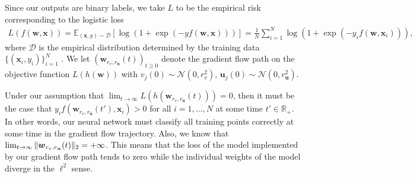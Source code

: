 \documentclass{article}
\begin{document}
Since our outputs are binary labels, we take $L$ to be the empirical risk corresponding to the logistic loss 
\begin{align}\label{logloss}
    L(f(\boldsymbol{w}, \boldsymbol{x})) = \mathbb{E}_{(\boldsymbol{x}, y) \sim \mathcal{D}} \left[\log \left( 1 + \exp(-y f(\boldsymbol{w}, \boldsymbol{x})) \right) \right] = \frac{1}{N} \sum_{i=1}^N \log \left( 1 + \exp(-y_i f(\boldsymbol{w}, \boldsymbol{x}_i)) \right),
\end{align}
where $\mathcal{D}$ is the empirical distribution determined by the training data $\{ (\boldsymbol{x}_i, y_i) \}_{i=1}^N$ \cite{wei2019regularization}. We let $(\boldsymbol{w}_{r_v, r_{\boldsymbol{u}}}(t))_{t \geq 0}$ denote the gradient flow path on the objective function $L(h(\boldsymbol{w}))$ with $v_j(0) \sim \mathcal{N}(0, r_v^2)$, $\boldsymbol{u}_j(0) \sim \mathcal{N}(0, r_{\boldsymbol{u}}^2)$.

Under our assumption that $\lim_{t \to \infty} L(h(\boldsymbol{w}_{r_v, r_{\boldsymbol{u}}}(t))) = 0$, then it must be the case that $y_i f(\boldsymbol{w}_{r_v, r_{\boldsymbol{u}}}(t'), \boldsymbol{x}_i) > 0$ for all $i=1,\ldots, N$ at some time $t' \in \mathbb{R}_+$. In other words, our neural network must classify all training points correctly at some time in the gradient flow trajectory. Also, we know that $\lim_{t \to \infty} \Vert \boldsymbol{w}_{r_v, r_{\boldsymbol{u}}}(t) \Vert_2\\ = +\infty$. This means that the loss of the model implemented by our gradient flow path tends to zero while the individual weights of the model diverge in the $\ell^2$ sense.
\end{document}
